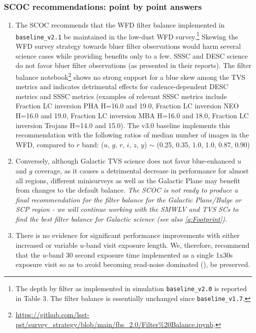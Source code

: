 \subsubsection{SCOC recommendations: point by point answers }\label{rec:filterdist}

\begin{enumerate}

\item The SCOC recommends that the WFD filter balance implemented in \texttt{baseline\_v2.1}  be maintained in the low-dust WFD survey.\footnote{The depth by filter as implemented in simulation \texttt{baseline\_v2.0} is reported in  Table 3. The filter balance is essentially unchanged since \texttt{baseline\_v1.7}.} Skewing the WFD survey strategy towards bluer filter observations would harm several science cases while providing benefits only to a few. 
SSSC and DESC science do not favor bluer filter observations (as presented in their reports).
The filter balance notebook\footnote{
\url{https://github.com/lsst-pst/survey_strategy/blob/main/fbs_2.0/Filter\%20Balance.ipynb}.
} shows no strong support for a blue skew among the TVS metrics and indicates detrimental effects for cadence-dependent DESC metrics and SSSC metrics (examples of relevant SSSC metrics include Fraction LC inversion PHA H=16.0 and 19.0, Fraction LC inversion NEO H=16.0 and 19.0, Fraction LC inversion MBA H=16.0 and 18.0, Fraction LC inversion Trojans H=14.0 and 15.0). The v3.0 baseline implements this recommendation with the following ratios of median number of images in the WFD, compared to $r$ band: ($u$, $g$, $r$, $i$, $z$, $y$) $\sim$ (0.25, 0.35, 1.0, 1.0, 0.87, 0.90)


\item Conversely, although Galactic TVS science does not favor blue-enhanced $u$ and $g$ coverage, as it causes a detrimental decrease in performance for almost all regions,  different minisurveys as well as the Galactic Plane may benefit from changes to the default balance. \emph{The SCOC is not ready to produce a final recommendation for the filter balance for the Galactic Plane/Bulge or SCP region - we will continue working with the SMWLV and TVS SCs to find the best filter balance for Galactic science (see also \autoref{q:Footprint}).}

\item There is no evidence for significant performance improvements with either increased or variable $u$-band visit exposure length. We, therefore, recommend that the $u$-band 30 second exposure time implemented as a single 1x30s exposure visit so as to avoid becoming read-noise dominated (),  be preserved.


\end{enumerate}
